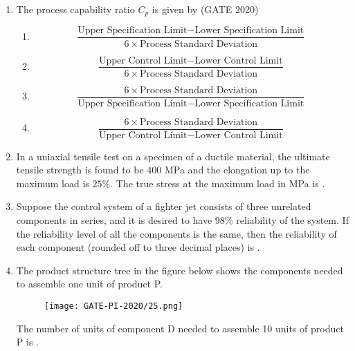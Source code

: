 \documentclass[journal,12pt,onecolumn]{IEEEtran}
\theoremstyle{remark}
\begin{document}
\begin{enumerate}
\item The process capability ratio $C_p$ is given by
\hfill{(GATE 2020)}
\begin{enumerate}
    \item 
    \[
    \frac{\text{Upper Specification Limit} - \text{Lower Specification Limit}}{6 \times \text{Process Standard Deviation}}
    \]
    \item 
    \[
    \frac{\text{Upper Control Limit} - \text{Lower Control Limit}}{6 \times \text{Process Standard Deviation}}
    \]
    \item 
    \[
    \frac{6 \times \text{Process Standard Deviation}}{\text{Upper Specification Limit} - \text{Lower Specification Limit}}
    \]
    \item 
    \[
    \frac{6 \times \text{Process Standard Deviation}}{\text{Upper Control Limit} - \text{Lower Control Limit}}
    \]
\end{enumerate}
\vspace{1cm}

\item In a uniaxial tensile test on a specimen of a ductile material, the ultimate tensile strength is found to be $400$ MPa and the elongation up to the maximum load is $25\%$. The true stress at the maximum load in MPa is \underline{\hspace{2cm}}.
\vspace{1cm}

\item Suppose the control system of a fighter jet consists of three unrelated components in series, and it is desired to have $98\%$ reliability of the system. If the reliability level of all the components is the same, then the reliability of each component (rounded off to three decimal places) is \underline{\hspace{2cm}}.
\vspace{1cm}

\item The product structure tree in the figure below shows the components needed to assemble one unit of product P.

\begin{figure}[H]
    \centering
    \texttt{[image: GATE-PI-2020/25.png]} 
    \caption{}
    \label{25}
\end{figure}

The number of units of component D needed to assemble 10 units of product P is \underline{\hspace{2cm}}.
\vspace{1cm}


\end{enumerate}
\end{document}
